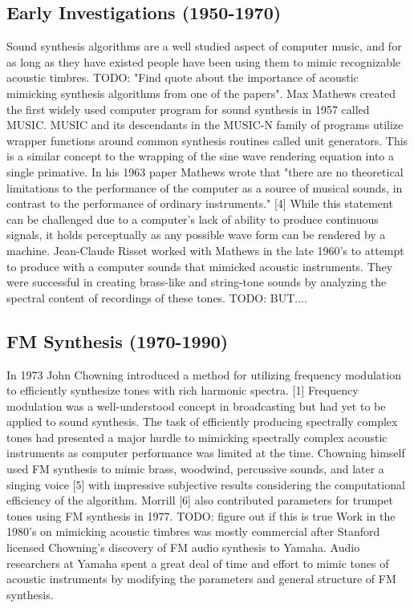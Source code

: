 \documentclass[12pt]{article}
\begin{document}
\subsection{Early Investigations (1950-1970)}
Sound synthesis algorithms are a well studied aspect of computer music, and for as long as they have existed people have been using them to mimic recognizable acoustic timbres. TODO: "Find quote about the importance of acoustic mimicking synthesis algorithms from one of the papers". Max Mathews created the first widely used computer program for sound synthesis in 1957 called MUSIC. MUSIC and its descendants in the MUSIC-N family of programs utilize wrapper functions around common synthesis routines called unit generators. This is a similar concept to the wrapping of the sine wave rendering equation into a single primative. In his 1963 paper Mathews wrote that "there are no theoretical limitations to the performance of the computer as a source of musical sounds, in contrast to the performance of ordinary instruments." [4] While this statement can be challenged due to a computer's lack of ability to produce continuous signals, it holds perceptually as any possible wave form can be rendered by a machine. Jean-Claude Risset worked with Mathews in the late 1960's to attempt to produce with a computer sounds that mimicked acoustic instruments. They were successful in creating brass-like and string-tone sounds by analyzing the spectral content of recordings of these tones. TODO: BUT....

\subsection{FM Synthesis (1970-1990)}
In 1973 John Chowning introduced a method for utilizing frequency modulation to efficiently synthesize tones with rich harmonic spectra. [1] Frequency modulation was a well-understood concept in broadcasting but had yet to be applied to sound synthesis. The task of efficiently producing spectrally complex tones had presented a major hurdle to mimicking spectrally complex acoustic instruments as computer performance was limited at the time. Chowning himself used FM synthesis to mimic brass, woodwind, percussive sounds, and later a singing voice [5] with impressive subjective results considering the computational efficiency of the algorithm. Morrill [6] also contributed parameters for trumpet tones using FM synthesis in 1977. TODO: figure out if this is true
Work in the 1980's on mimicking acoustic timbres was mostly commercial after Stanford licensed Chowning's discovery of FM audio synthesis to Yamaha. Audio researchers at Yamaha spent a great deal of time and effort to mimic tones of acoustic instruments by modifying the parameters and general structure of FM synthesis.
\end{document}
